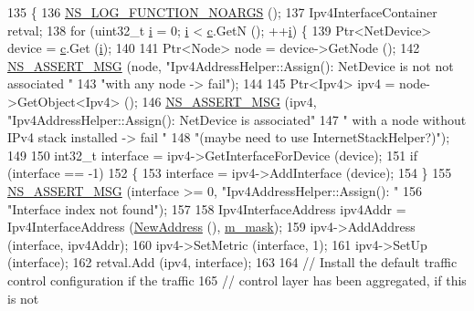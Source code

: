 \begin{DoxyCode}
135 \{
136   \hyperlink{log-macros-disabled_8h_a8f7e4afc291c9d29a65c18ac1f79197b}{NS\_LOG\_FUNCTION\_NOARGS} ();
137   Ipv4InterfaceContainer retval;
138   \textcolor{keywordflow}{for} (uint32\_t \hyperlink{bernuolliDistribution_8m_a6f6ccfcf58b31cb6412107d9d5281426}{i} = 0; \hyperlink{bernuolliDistribution_8m_a6f6ccfcf58b31cb6412107d9d5281426}{i} < \hyperlink{lte_2model_2fading-traces_2fading__trace__generator_8m_ae0323a9039add2978bf5b49550572c7c}{c}.GetN (); ++\hyperlink{bernuolliDistribution_8m_a6f6ccfcf58b31cb6412107d9d5281426}{i}) \{
139       Ptr<NetDevice> device = \hyperlink{lte_2model_2fading-traces_2fading__trace__generator_8m_ae0323a9039add2978bf5b49550572c7c}{c}.Get (\hyperlink{bernuolliDistribution_8m_a6f6ccfcf58b31cb6412107d9d5281426}{i});
140 
141       Ptr<Node> node = device->GetNode ();
142       \hyperlink{assert_8h_aff5ece9066c74e681e74999856f08539}{NS\_ASSERT\_MSG} (node, \textcolor{stringliteral}{"Ipv4AddressHelper::Assign(): NetDevice is not not associated "}
143                      \textcolor{stringliteral}{"with any node -> fail"});
144 
145       Ptr<Ipv4> ipv4 = node->GetObject<Ipv4> ();
146       \hyperlink{assert_8h_aff5ece9066c74e681e74999856f08539}{NS\_ASSERT\_MSG} (ipv4, \textcolor{stringliteral}{"Ipv4AddressHelper::Assign(): NetDevice is associated"}
147                      \textcolor{stringliteral}{" with a node without IPv4 stack installed -> fail "}
148                      \textcolor{stringliteral}{"(maybe need to use InternetStackHelper?)"});
149 
150       int32\_t \textcolor{keyword}{interface }= ipv4->GetInterfaceForDevice (device);
151       \textcolor{keywordflow}{if} (interface == -1)
152         \{
153           \textcolor{keyword}{interface }= ipv4->AddInterface (device);
154         \}
155       \hyperlink{assert_8h_aff5ece9066c74e681e74999856f08539}{NS\_ASSERT\_MSG} (interface >= 0, \textcolor{stringliteral}{"Ipv4AddressHelper::Assign(): "}
156                      \textcolor{stringliteral}{"Interface index not found"});
157 
158       Ipv4InterfaceAddress ipv4Addr = Ipv4InterfaceAddress (\hyperlink{classns3_1_1Ipv4AddressHelper_a9d6bc3cd8def204f9c253fce666b2edd}{NewAddress} (), 
      \hyperlink{classns3_1_1Ipv4AddressHelper_a1609535faf34e2010483660d881fe29e}{m\_mask});
159       ipv4->AddAddress (interface, ipv4Addr);
160       ipv4->SetMetric (interface, 1);
161       ipv4->SetUp (interface);
162       retval.Add (ipv4, interface);
163 
164       \textcolor{comment}{// Install the default traffic control configuration if the traffic}
165       \textcolor{comment}{// control layer has been aggregated, if this is not }

\end{DoxyCode}
